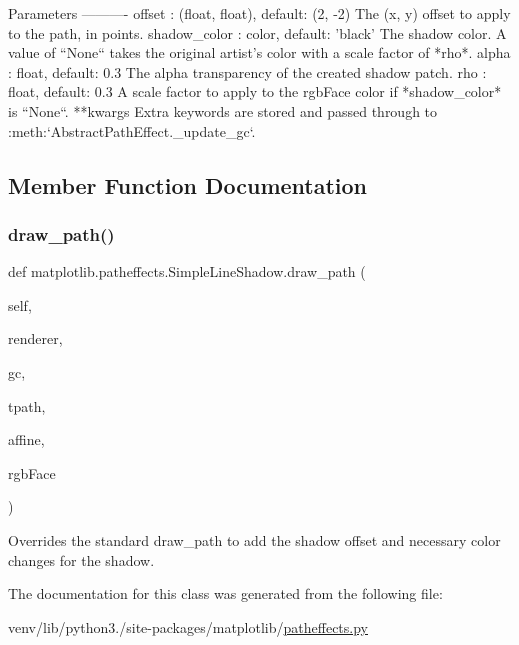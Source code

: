 \begin{DoxyVerb}Parameters
----------
offset : (float, float), default: (2, -2)
    The (x, y) offset to apply to the path, in points.
shadow_color : color, default: 'black'
    The shadow color.
    A value of ``None`` takes the original artist's color
    with a scale factor of *rho*.
alpha : float, default: 0.3
    The alpha transparency of the created shadow patch.
rho : float, default: 0.3
    A scale factor to apply to the rgbFace color if *shadow_color*
    is ``None``.
**kwargs
    Extra keywords are stored and passed through to
    :meth:`AbstractPathEffect._update_gc`.
\end{DoxyVerb}
 

\subsection{Member Function Documentation}
\mbox{\label{classmatplotlib_1_1patheffects_1_1SimpleLineShadow_a1018cb753f7fa1c14eef2e654508e42d}} 
\subsubsection{\texorpdfstring{draw\+\_\+path()}{draw\_path()}}
{\footnotesize\ttfamily def matplotlib.\+patheffects.\+Simple\+Line\+Shadow.\+draw\+\_\+path (\begin{DoxyParamCaption}\item[{}]{self,  }\item[{}]{renderer,  }\item[{}]{gc,  }\item[{}]{tpath,  }\item[{}]{affine,  }\item[{}]{rgb\+Face }\end{DoxyParamCaption})}

\begin{DoxyVerb}Overrides the standard draw_path to add the shadow offset and
necessary color changes for the shadow.
\end{DoxyVerb}
 

The documentation for this class was generated from the following file\+:\begin{DoxyCompactItemize}
\item 
venv/lib/python3./site-\/packages/matplotlib/\hyperlink{patheffects_8py}{patheffects.\+py}\end{DoxyCompactItemize}
